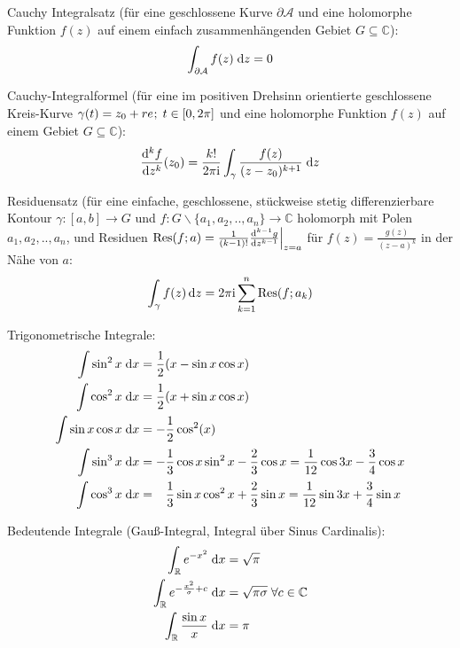 \documentclass[11pt]{article}
\numberwithin{equation}{section}
\begin{document}
				\noindent
				Cauchy Integralsatz (für eine geschlossene Kurve $\partial \mathcal{A}$ und eine holomorphe Funktion $f(z)$ auf einem einfach zusammenhängenden Gebiet $G \subseteq \mathbb{C}$):
				\begin{equation}
					\int_{\partial \mathcal{A}} f(z)\;\mathrm{d} z = 0
				\end{equation}

				\noindent
				Cauchy-Integralformel (für eine im positiven Drehsinn orientierte geschlossene Kreis-Kurve $\gamma(t)=z_0+re^{\it};\;t\in[0,2\pi]$ und eine holomorphe Funktion $f(z)$ auf einem Gebiet $G \subseteq \mathbb{C}$):
				\begin{equation}
					\frac{\mathrm{d}^k f}{\mathrm{d} z^k}(z_0) = \frac{k!}{2\pi \mathrm{i}} \int_\gamma \frac{f(z)}{(z-z_0)^{k+1}}\;\mathrm{d} z
				\end{equation}

				\noindent
				Residuensatz (für eine einfache, geschlossene, stückweise stetig differenzierbare Kontour $\gamma:\left[a,b\right]\rightarrow G$ und $f:G\backslash\lbrace a_1, a_2, .., a_n\rbrace \rightarrow \mathbb{C}$ holomorph mit Polen $a_1, a_2, .., a_n$, und Residuen $\mathrm{Res}(f; a) = \frac{1}{(k-1)!}\frac{\mathrm{d}^{k-1} g}{\mathrm{d} z^{k-1}}\Big|_{z=a}$ für $f(z)=\frac{g(z)}{(z-a)^k}$ in der Nähe von $a$:
				\begin{equation}
					\int_\gamma f(z)\,\mathrm{d} z = 2\pi \mathrm{i} \sum_{k=1}^{n} \mathrm{Res}(f; a_k)
				\end{equation}

				\noindent
				Trigonometrische Integrale:
				\begin{equation}
					\begin{split}
						\int \sin^2 x\;\mathrm{d} x &= \frac{1}{2}( x-\sin  x\cos  x) \\
						\int \cos^2 x\;\mathrm{d} x &= \frac{1}{2}( x+\sin  x\cos  x) \\
						\int{\sin x\cos x\; \mathrm{d} x} &= -\frac{1}{2}\cos^2( x) \\
						\int \sin^3 x\;\mathrm{d} x &= -\frac{1}{3}\cos{ x}\sin^2{ x}-\frac{2}{3}\cos{ x}
						= \frac{1}{12}\cos{3 x}-\frac{3}{4}\cos{ x} \\
						\int \cos^3 x\;\mathrm{d} x &= \phantom{-}\frac{1}{3}\sin x \cos^2 x+\frac{2}{3}\sin  x
						= \frac{1}{12}\sin{3 x}+\frac{3}{4}\sin{ x} \\
					\end{split}
				\end{equation}

				\noindent
				Bedeutende Integrale (Gauß-Integral, Integral über Sinus Cardinalis):
				\begin{equation}
					\begin{aligned}
						\int_\mathbb{R} e^{-x^2}\;\mathrm{d} x &= \sqrt{\pi} \\
						\int_\mathbb{R} e^{-\frac{x^2}{\sigma}+c}\;\mathrm{d} x &= \sqrt{\pi\sigma} \;\forall c\in\mathbb{C} \\
						\int_\mathbb{R} \frac{\sin x}{x}\;\mathrm{d} x &= \pi \\
					\end{aligned}
				\end{equation}
\end{document}
